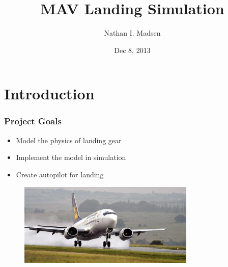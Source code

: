\documentclass[10pt]{beamer}
\title{MAV Landing Simulation }
\author{Nathan I. Madsen}
\institute{ECEn 674\\Brigham Young University}
\date{Dec 8, 2013}
\begin{document}
{
  \usebackgroundtemplate{%
    \parbox[c][\paperheight][c]{\paperwidth}{%
    }
  }
  \frame{\titlepage}
}
\section{Introduction}
\begin{frame}
  \frametitle{Project Goals}
    \begin{itemize}
    \item Model the physics of landing gear
    \item Implement the model in simulation
    \item Create autopilot for landing  
    \end{itemize}
    \begin{figure}[h]
      \includegraphics[width=0.75\textwidth]{img/plane-landing.jpg}
    \end{figure}

\end{frame}
\end{document}
